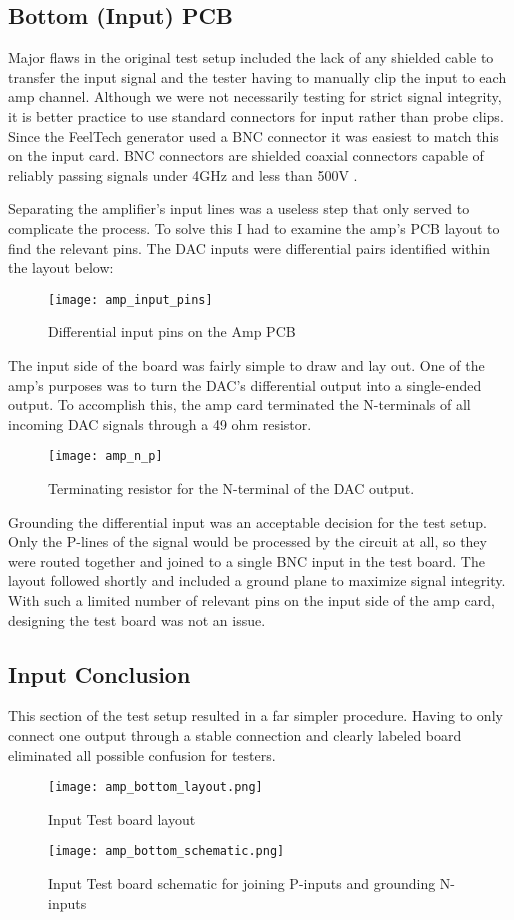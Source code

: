 \subsection{Bottom (Input) PCB}
Major flaws in the original test setup included the lack of any shielded cable to transfer the input signal and the tester having to manually clip the input to each amp channel. Although we were not necessarily testing for strict signal integrity, it is better practice to use standard connectors for input rather than probe clips. Since the FeelTech generator used a BNC connector it was easiest to match this on the input card. BNC connectors are shielded coaxial connectors capable of reliably passing signals under 4GHz and less than 500V \cite{bncbook}. \par
Separating the amplifier's input lines was a useless step that only served to complicate the process. To solve this I had to examine the amp's PCB layout to find the relevant pins. The DAC inputs were differential pairs identified within the layout below:
\begin{figure}[!htb]
	\centering
	\texttt{[image: amp\_input\_pins]}
	\caption{Differential input pins on the Amp PCB}
\end{figure}
The input side of the board was fairly simple to draw and lay out. One of the amp's purposes was to turn the DAC's differential output into a single-ended output. To accomplish this, the amp card terminated the N-terminals of all incoming DAC signals through a 49 ohm resistor.
\begin{figure}[!htb]
	\centering
	\texttt{[image: amp\_n\_p]}
	\caption{Terminating resistor for the N-terminal of the DAC output.}
\end{figure}
Grounding the differential input was an acceptable decision for the test setup. Only the P-lines of the signal would be processed by the circuit at all, so they were routed together and joined to a single BNC input in the test board.
The layout followed shortly and included a ground plane to maximize signal integrity. With such a limited number of relevant pins on the input side of the amp card, designing the test board was not an issue. \par
\subsection{Input Conclusion}
This section of the test setup resulted in a far simpler procedure. Having to only connect one output through a stable connection and clearly labeled board eliminated all possible confusion for testers.
\begin{figure}[!htb]
	\centering
	\texttt{[image: amp\_bottom\_layout.png]}
	\caption{Input Test board layout}
\end{figure}
\begin{figure}[!htb]
	\centering
	\texttt{[image: amp\_bottom\_schematic.png]}
	\caption{Input Test board schematic for joining P-inputs and grounding N-inputs}
\end{figure}

